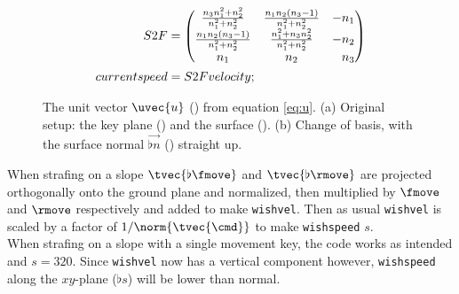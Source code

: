 \begin{align*}
S2F &=
\begin{pmatrix}
\frac{n_3 n_1^2 + n_2^2}{n_1^2 + n_2^2} & \frac{n_1 n_2 (n_3 - 1)}{n_1^2 + n_2^2} & -n_1\\
\frac{n_1 n_2 (n_3 - 1)}{n_1^2 + n_2^2} & \frac{n_1^2 + n_3 n_2^2}{n_1^2 + n_2^2} & -n_2\\
n_1 & n_2 & \hphantom{-}n_3
\end{pmatrix}\\
currentspeed &= S2F velocity;
\end{align*}

\begin{figure}[H]
	\centering
	\begin{subfigure}[t]{\textwidth}
		\centering
		\begin{subfigure}[t]{0.5\textwidth}
			\centering
			\setlength\figureheight{6.5cm}
			\setlength\figurewidth{6.5cm}
		\end{subfigure}%
		\begin{subfigure}[t]{0.5\textwidth}
			\centering
			\setlength\figureheight{5cm}
			\setlength\figurewidth{5cm}
		\end{subfigure}
		\caption{}
	\end{subfigure}
	\begin{subfigure}[t]{\textwidth}
		\centering
		\begin{subfigure}[t]{0.5\textwidth}
			\centering
			\setlength\figureheight{6.5cm}
			\setlength\figurewidth{6.5cm}
		\end{subfigure}%
		\begin{subfigure}[t]{0.5\textwidth}
			\centering
			\setlength\figureheight{5cm}
			\setlength\figurewidth{5cm}
		\end{subfigure}
		\caption{}
	\end{subfigure}
	\caption{The unit vector $\protect\uvec{u}$ (\purplearrow) from equation \eqref{eq:u}. (a) Original setup: the key plane (\orangearea) and the surface (\greenarea). (b) Change of basis, with the surface normal $\vec{\flat{n}}$ (\greenarrow) straight up.}
\end{figure}

When strafing on a slope $\tvec{\flat{\fmove}}$ and $\tvec{\flat{\rmove}}$ are projected orthogonally onto the ground plane and normalized, then multiplied by $\fmove$ and $\rmove$ respectively and added to make \texttt{wishvel}. Then as usual \texttt{wishvel} is scaled by a factor of $1/\norm{\tvec{\cmd}}$ to make \texttt{wishspeed} $s$.\\
When strafing on a slope with a single movement key, the code works as intended and $s = 320$. Since \texttt{wishvel} now has a vertical component however, \texttt{wishspeed} along the $xy$-plane ($\flat{s}$) will be lower than normal.

